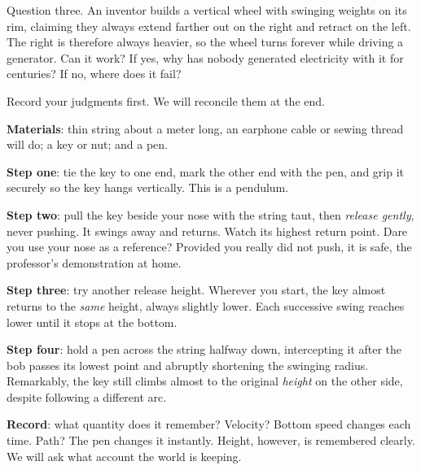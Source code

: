 Question three. An inventor builds a vertical wheel with swinging weights on its rim, claiming they always extend farther out on the right and retract on the left. The right is therefore always heavier, so the wheel turns forever while driving a generator. Can it work? If yes, why has nobody generated electricity with it for centuries? If no, where does it fail?

Record your judgments first. We will reconcile them at the end.


\begin{experiment}
\textbf{Materials}: thin string about a meter long, an earphone cable or sewing thread will do; a key or nut; and a pen.

\textbf{Step one}: tie the key to one end, mark the other end with the pen, and grip it securely so the key hangs vertically. This is a pendulum.

\textbf{Step two}: pull the key beside your nose with the string taut, then \emph{release gently}, never pushing. It swings away and returns. Watch its highest return point. Dare you use your nose as a reference? Provided you really did not push, it is safe, the professor's demonstration at home.

\textbf{Step three}: try another release height. Wherever you start, the key almost returns to the \emph{same} height, always slightly lower. Each successive swing reaches lower until it stops at the bottom.

\textbf{Step four}: hold a pen across the string halfway down, intercepting it after the bob passes its lowest point and abruptly shortening the swinging radius. Remarkably, the key still climbs almost to the original \emph{height} on the other side, despite following a different arc.

\textbf{Record}: what quantity does it remember? Velocity? Bottom speed changes each time. Path? The pen changes it instantly. Height, however, is remembered clearly. We will ask what account the world is keeping.
\end{experiment}

